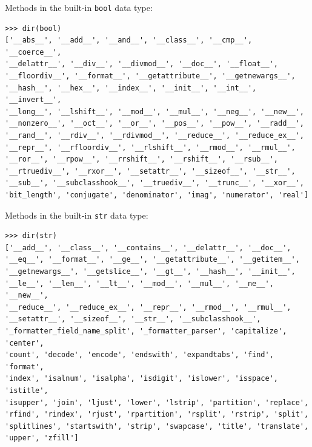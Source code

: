 \documentclass[8pt,a4paper,compress,handout]{beamer}
\begin{document}
\begin{frame}[fragile]
Methods in the built-in \lstinline{bool} data type:
\begin{lstlisting}[language={}]
>>> dir(bool) 
['__abs__', '__add__', '__and__', '__class__', '__cmp__', '__coerce__', 
'__delattr__', '__div__', '__divmod__', '__doc__', '__float__', 
'__floordiv__', '__format__', '__getattribute__', '__getnewargs__', 
'__hash__', '__hex__', '__index__', '__init__', '__int__', '__invert__', 
'__long__', '__lshift__', '__mod__', '__mul__', '__neg__', '__new__', 
'__nonzero__', '__oct__', '__or__', '__pos__', '__pow__', '__radd__', 
'__rand__', '__rdiv__', '__rdivmod__', '__reduce__', '__reduce_ex__', 
'__repr__', '__rfloordiv__', '__rlshift__', '__rmod__', '__rmul__', 
'__ror__', '__rpow__', '__rrshift__', '__rshift__', '__rsub__', 
'__rtruediv__', '__rxor__', '__setattr__', '__sizeof__', '__str__', 
'__sub__', '__subclasshook__', '__truediv__', '__trunc__', '__xor__', 
'bit_length', 'conjugate', 'denominator', 'imag', 'numerator', 'real']
\end{lstlisting}

\bigskip

Methods in the built-in \lstinline{str} data type:
\begin{lstlisting}[language={}]
>>> dir(str)
['__add__', '__class__', '__contains__', '__delattr__', '__doc__', 
'__eq__', '__format__', '__ge__', '__getattribute__', '__getitem__', 
'__getnewargs__', '__getslice__', '__gt__', '__hash__', '__init__', 
'__le__', '__len__', '__lt__', '__mod__', '__mul__', '__ne__', '__new__', 
'__reduce__', '__reduce_ex__', '__repr__', '__rmod__', '__rmul__', 
'__setattr__', '__sizeof__', '__str__', '__subclasshook__', 
'_formatter_field_name_split', '_formatter_parser', 'capitalize', 'center', 
'count', 'decode', 'encode', 'endswith', 'expandtabs', 'find', 'format', 
'index', 'isalnum', 'isalpha', 'isdigit', 'islower', 'isspace', 'istitle', 
'isupper', 'join', 'ljust', 'lower', 'lstrip', 'partition', 'replace', 
'rfind', 'rindex', 'rjust', 'rpartition', 'rsplit', 'rstrip', 'split', 
'splitlines', 'startswith', 'strip', 'swapcase', 'title', 'translate', 
'upper', 'zfill']
\end{lstlisting}
\end{frame}
\end{document}
